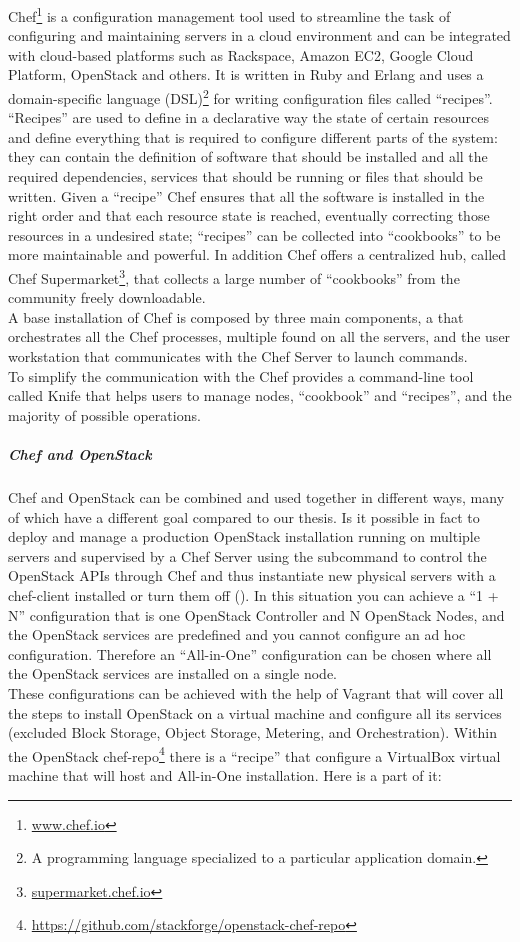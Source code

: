 Chef\footnote{\url{www.chef.io}} is a configuration management tool used to streamline the task of configuring and maintaining servers in a cloud environment and can be integrated with cloud-based platforms such as Rackspace, Amazon EC2, Google Cloud Platform, OpenStack and others. It is written in Ruby and Erlang and uses a domain-specific language (DSL)\footnote{A programming language specialized to a particular application domain.} for writing configuration files called ``recipes''. ``Recipes'' are used to define in a declarative way the state of certain resources and define everything that is required to configure different parts of the system: they can contain the definition of software that should be installed and all the required dependencies, services that should be running or files that should be written. Given a ``recipe'' Chef ensures that all the software is installed in the right order and that each resource state is reached, eventually correcting those resources in a undesired state; ``recipes'' can be collected into ``cookbooks'' to be more maintainable and powerful. In addition Chef offers a centralized hub, called Chef Supermarket\footnote{\url{supermarket.chef.io}}, that collects a large number of ``cookbooks'' from the community freely downloadable.\\
A base installation of Chef is composed by three main components, a  that orchestrates all the Chef processes, multiple  found on all the servers, and the user workstation that communicates with the Chef Server to launch commands.\\
To simplify the communication with the  Chef provides a command-line tool called Knife that helps users to manage nodes, ``cookbook'' and ``recipes'', and the majority of possible operations.

\subparagraph{Chef and OpenStack}
\label{subp:sota_chef_openstack}

Chef and OpenStack can be combined and used together in different ways, many of which have a different goal compared to our thesis. Is it possible in fact to deploy and manage a production OpenStack installation running on multiple servers and supervised by a Chef Server using the subcommand  to control the OpenStack APIs through Chef and thus instantiate new physical servers with a chef-client installed or turn them off ().
In this situation you can achieve a ``1 + N'' configuration that is one OpenStack Controller and N OpenStack Nodes, and the OpenStack services are predefined and you cannot configure an ad hoc configuration.
Therefore an ``All-in-One'' configuration can be chosen where all the OpenStack services are installed on a single node.\\
These configurations can be achieved with the help of Vagrant that will cover all the steps to install OpenStack on a virtual machine and configure all its services (excluded Block Storage, Object Storage, Metering, and Orchestration). Within the OpenStack chef-repo\footnote{\url{https://github.com/stackforge/openstack-chef-repo}} there is a ``recipe'' that configure a VirtualBox virtual machine that will host and All-in-One installation. Here is a part of it:


